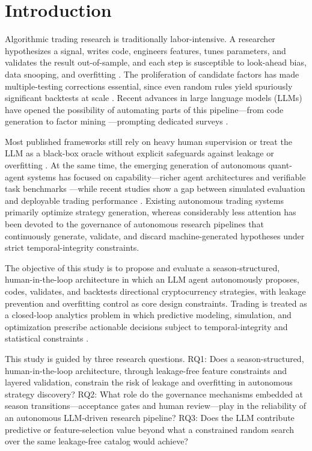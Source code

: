 \documentclass[analytics,article,submit,pdftex,moreauthors]{Definitions/mdpi}
\begin{document}
\section{Introduction}\label{introduction}

Algorithmic trading research is traditionally labor-intensive. A researcher hypothesizes a signal, writes code, engineers features, tunes parameters, and validates the result out-of-sample, and each step is susceptible to look-ahead bias, data snooping, and overfitting \citep{bailey_2014,harvey_2015}. The proliferation of candidate factors has made multiple-testing corrections essential, since even random rules yield spuriously significant backtests at scale \citep{harvey_2016}. Recent advances in large language models (LLMs) have opened the possibility of automating parts of this pipeline---from code generation \citep{chen_2021} to factor mining \citep{wang_2023}---prompting dedicated surveys \citep{fu_2025}.

Most published frameworks still rely on heavy human supervision or treat the LLM as a black-box oracle without explicit safeguards against leakage or overfitting \citep{bailey_2014, kaufman_2012, sobreiro_2026}. At the same time, the emerging generation of autonomous quant-agent systems has focused on capability---richer agent architectures and verifiable task benchmarks \citep{jadhav_mirza_2025, zhang_2024_finagent}---while recent studies show a gap between simulated evaluation and deployable trading performance \citep{liu_2021, sobreiro_2026}. Existing autonomous trading systems primarily optimize strategy generation, whereas considerably less attention has been devoted to the governance of autonomous research pipelines that continuously generate, validate, and discard machine-generated hypotheses under strict temporal-integrity constraints.

The objective of this study is to propose and evaluate a season-structured, human-in-the-loop architecture in which an LLM agent autonomously proposes, codes, validates, and backtests directional cryptocurrency strategies, with leakage prevention and overfitting control as core design constraints. Trading is treated as a closed-loop analytics problem in which predictive modeling, simulation, and optimization prescribe actionable decisions subject to temporal-integrity and statistical constraints \citep{shmueli_2011, bertsimas_2020}.

This study is guided by three research questions. RQ1: Does a season-structured, human-in-the-loop architecture, through leakage-free feature constraints and layered validation, constrain the risk of leakage and overfitting in autonomous strategy discovery? RQ2: What role do the governance mechanisms embedded at season transitions---acceptance gates and human review---play in the reliability of an autonomous LLM-driven research pipeline? RQ3: Does the LLM contribute predictive or feature-selection value beyond what a constrained random search over the same leakage-free catalog would achieve?
\end{document}
